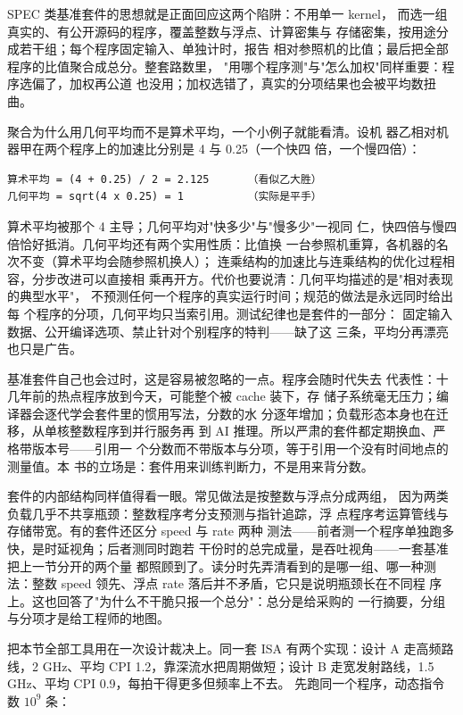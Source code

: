 SPEC 类基准套件的思想就是正面回应这两个陷阱：不用单一 kernel，
而选一组真实的、有公开源码的程序，覆盖整数与浮点、计算密集与
存储密集，按用途分成若干组；每个程序固定输入、单独计时，报告
相对参照机的比值；最后把全部程序的比值聚合成总分。整套路数里，
"用哪个程序测"与"怎么加权"同样重要：程序选偏了，加权再公道
也没用；加权选错了，真实的分项结果也会被平均数扭曲。

聚合为什么用几何平均而不是算术平均，一个小例子就能看清。设机
器乙相对机器甲在两个程序上的加速比分别是 4 与 0.25（一个快四
倍，一个慢四倍）：

\begin{lstlisting}
算术平均 = (4 + 0.25) / 2 = 2.125      （看似乙大胜）
几何平均 = sqrt(4 x 0.25) = 1          （实际是平手）
\end{lstlisting}

算术平均被那个 4 主导；几何平均对"快多少"与"慢多少"一视同
仁，快四倍与慢四倍恰好抵消。几何平均还有两个实用性质：比值换
一台参照机重算，各机器的名次不变（算术平均会随参照机换人）；
连乘结构的加速比与连乘结构的优化过程相容，分步改进可以直接相
乘再开方。代价也要说清：几何平均描述的是"相对表现的典型水平"，
不预测任何一个程序的真实运行时间；规范的做法是永远同时给出每
个程序的分项，几何平均只当索引用。测试纪律也是套件的一部分：
固定输入数据、公开编译选项、禁止针对个别程序的特判——缺了这
三条，平均分再漂亮也只是广告。

基准套件自己也会过时，这是容易被忽略的一点。程序会随时代失去
代表性：十几年前的热点程序放到今天，可能整个被 cache 装下，存
储子系统毫无压力；编译器会逐代学会套件里的惯用写法，分数的水
分逐年增加；负载形态本身也在迁移，从单核整数程序到并行服务再
到 AI 推理。所以严肃的套件都定期换血、严格带版本号——引用一
个分数而不带版本与分项，等于引用一个没有时间地点的测量值。本
书的立场是：套件用来训练判断力，不是用来背分数。

套件的内部结构同样值得看一眼。常见做法是按整数与浮点分成两组，
因为两类负载几乎不共享瓶颈：整数程序考分支预测与指针追踪，浮
点程序考运算管线与存储带宽。有的套件还区分 speed 与 rate 两种
测法——前者测一个程序单独跑多快，是时延视角；后者测同时跑若
干份时的总完成量，是吞吐视角——一套基准把上一节分开的两个量
都照顾到了。读分时先弄清看到的是哪一组、哪一种测法：整数
speed 领先、浮点 rate 落后并不矛盾，它只是说明瓶颈长在不同程
序上。这也回答了"为什么不干脆只报一个总分"：总分是给采购的
一行摘要，分组与分项才是给工程师的地图。

把本节全部工具用在一次设计裁决上。同一套 ISA 有两个实现：设计
A 走高频路线，2 GHz、平均 CPI 1.2，靠深流水把周期做短；设计 B
走宽发射路线，1.5 GHz、平均 CPI 0.9，每拍干得更多但频率上不去。
先跑同一个程序，动态指令数 $10^9$ 条：

